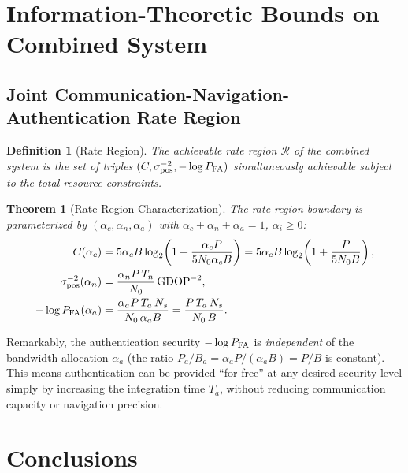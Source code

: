 \documentclass[twocolumn,superscriptaddress,prd,nofootinbib]{revtex4-2}
\newtheorem{theorem}{Theorem}
\newtheorem{definition}{Definition}
\begin{document}
\section{Information-Theoretic Bounds on Combined System}
\label{sec:bounds}

\subsection{Joint Communication-Navigation-Authentication Rate Region}

\begin{definition}[Rate Region]
The achievable rate region $\mathcal{R}$ of the combined system is the
set of triples $(C, \sigma_{\rm pos}^{-2}, -\log P_{\rm FA})$
simultaneously achievable subject to the total resource constraints.
\end{definition}

\begin{theorem}[Rate Region Characterization]
The rate region boundary is parameterized by
$(\alpha_c, \alpha_n, \alpha_a)$ with $\alpha_c + \alpha_n + \alpha_a = 1$,
$\alpha_i \geq 0$:
\begin{align}
C(\alpha_c) &= 5\alpha_c B\log_2\!\left(1 + \frac{\alpha_c P}{5N_0\alpha_c B}\right)
= 5\alpha_c B\log_2\!\left(1 + \frac{P}{5N_0 B}\right), \\
\sigma_{\rm pos}^{-2}(\alpha_n) &= \frac{\alpha_n P\,T_n}{N_0}\,\text{GDOP}^{-2}, \\
-\log P_{\rm FA}(\alpha_a) &= \frac{\alpha_a P\,T_a\,N_s}{N_0\,\alpha_a B}
= \frac{P\,T_a\,N_s}{N_0\,B}.
\end{align}
\end{theorem}

Remarkably, the authentication security $-\log P_{\rm FA}$ is
\emph{independent} of the bandwidth allocation $\alpha_a$ (the ratio
$P_a/B_a = \alpha_a P/(\alpha_a B) = P/B$ is constant). This means
authentication can be provided ``for free'' at any desired security level
simply by increasing the integration time $T_a$, without reducing
communication capacity or navigation precision.

\section{Conclusions}\label{sec:conclusions}
\end{document}
